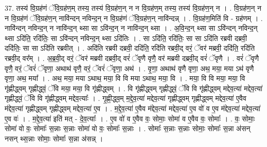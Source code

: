 \documentclass[17pt]{extarticle}
\begin{document}
37. तस्य॑ वि॒ग्रह॑णं ॅवि॒ग्रह॑ण॒म् तस्य॒ तस्य॑ वि॒ग्रह॑ण॒न् न न वि॒ग्रह॑ण॒म् तस्य॒ तस्य॑ वि॒ग्रह॑ण॒न् न । . वि॒ग्रह॑ण॒न् न न वि॒ग्रह॑णं ॅवि॒ग्रह॑ण॒न् नावि॑न्दन् नविन्द॒न् न वि॒ग्रह॑णं ॅवि॒ग्रह॑ण॒न् नावि॑न्दन्न् । . वि॒ग्रह॑ण॒मिति॑ वि - ग्रह॑णम् । . नावि॑न्दन् नविन्द॒न् न नावि॑न्द॒न् थ्सा सा ऽवि॑न्द॒न् न नावि॑न्द॒न् थ्सा । . अ॒वि॒न्द॒न् थ्सा सा ऽवि॑न्दन् नविन्द॒न् थ्सा ऽदि॑ति॒ रदि॑तिः॒ सा ऽवि॑न्दन् नविन्द॒न् थ्सा ऽदि॑तिः । . सा ऽदि॑ति॒ रदि॑तिः॒ सा सा ऽदि॑ति रब्रवी दब्रवी॒ ददि॑तिः॒ सा सा ऽदि॑ति रब्रवीत् । . अदि॑ति रब्रवी दब्रवी॒ ददि॑ति॒ रदि॑ति रब्रवी॒द् वरं॒ ॅवर॑ मब्रवी॒ ददि॑ति॒ रदि॑ति रब्रवी॒द् वर᳚म् । . अ॒ब्र॒वी॒द् वरं॒ ॅवर॑ मब्रवी दब्रवी॒द् वरं॑ ॅवृणै वृणै॒ वर॑ मब्रवी दब्रवी॒द् वरं॑ ॅवृणै । . वरं॑ ॅवृणै वृणै॒ वरं॒ ॅवरं॑ ॅवृणा॒ अथाथ॑ वृणै॒ वरं॒ ॅवरं॑ ॅवृणा॒ अथ॑ । . वृ॒णा॒ अथाथ॑ वृणै वृणा॒ अथ॒ मया॒ मया ऽथ॑ वृणै वृणा॒ अथ॒ मया᳚ । . अथ॒ मया॒ मया ऽथाथ॒ मया॒ वि वि मया ऽथाथ॒ मया॒ वि । . मया॒ वि वि मया॒ मया॒ वि गृ॑ह्णीद्ध्वम् गृह्णीद्ध्वं॒ ॅवि मया॒ मया॒ वि गृ॑ह्णीद्ध्वम् । . वि गृ॑ह्णीद्ध्वम् गृह्णीद्ध्वं॒ ॅवि वि गृ॑ह्णीद्ध्वम् मद्देव॒त्या॑ मद्देव॒त्या॑ गृह्णीद्ध्वं॒ ॅवि वि गृ॑ह्णीद्ध्वम् मद्देव॒त्याः᳚ । . गृ॒ह्णी॒द्ध्व॒म् म॒द्दे॒व॒त्या॑ मद्देव॒त्या॑ गृह्णीद्ध्वम् गृह्णीद्ध्वम् मद्देव॒त्या॑ ए॒वैव म॑द्देव॒त्या॑ गृह्णीद्ध्वम् गृह्णीद्ध्वम् मद्देव॒त्या॑ ए॒व । . म॒द्दे॒व॒त्या॑ ए॒वैव म॑द्देव॒त्या॑ मद्देव॒त्या॑ ए॒व वो॑ व ए॒व म॑द्देव॒त्या॑ मद्देव॒त्या॑ ए॒व वः॑ । . म॒द्दे॒व॒त्या॑ इति॑ मत् - दे॒व॒त्याः᳚ । . ए॒व वो॑ व ए॒वैव वः॒ सोमाः॒ सोमा॑ व ए॒वैव वः॒ सोमाः᳚ । . वः॒ सोमाः॒ सोमा॑ वो वः॒ सोमाः᳚ स॒न्नाः स॒न्नाः सोमा॑ वो वः॒ सोमाः᳚ स॒न्नाः । . सोमाः᳚ स॒न्नाः स॒न्नाः सोमाः॒ सोमाः᳚ स॒न्ना अ॑सन् नसन् थ्स॒न्नाः सोमाः॒ सोमाः᳚ स॒न्ना अ॑सन्न् । \newline
\pagebreak
{}
\end{document}

